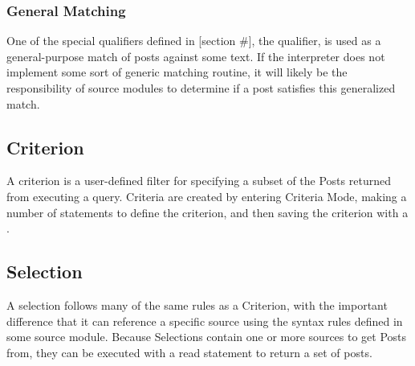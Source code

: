 \subsubsection{General Matching}%
One of the special qualifiers defined in [section #], the  qualifier, is used as a general-purpose 
match of posts against some text. If the interpreter does not implement some sort of generic matching 
routine, it will likely be the responsibility of source modules to determine if a post satisfies this 
generalized match.

\subsection{Criterion}
A criterion is a user-defined filter for specifying a subset of the Posts returned from executing a query. 
Criteria are created by entering Criteria Mode, making a number of statements to define the criterion, and 
then saving the criterion with a .

\subsection{Selection}
A selection follows many of the same rules as a Criterion, with the important difference that it can 
reference a specific source using the syntax rules defined in some source module. Because Selections 
contain one or more sources to get Posts from, they can be executed with a read statement to return a 
set of posts.
